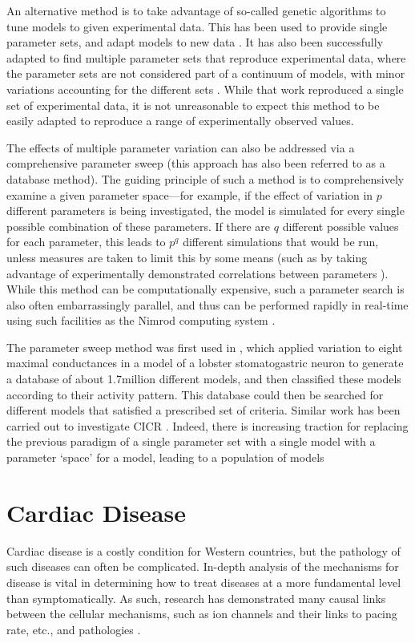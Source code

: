 \documentclass[../thesis-main.tex]{subfiles}
\begin{document}
 An alternative method is to take advantage of so-called genetic algorithms to tune models to given experimental data. This has been used to provide single parameter sets, and adapt models to new data \citep{Kherlopian2011}. It has also been successfully adapted to find multiple parameter sets that reproduce experimental data, where the parameter sets are not considered part of a continuum of models, with minor variations accounting for the different sets \citep{Achard2006, Syed2005}. While that work reproduced a single set of experimental data, it is not unreasonable to expect this method to be easily adapted to reproduce a range of experimentally observed values.
 
 The effects of multiple parameter variation can also be addressed via a comprehensive parameter sweep (this approach has also been referred to as a database method). The guiding principle of such a method is to comprehensively examine a given parameter space---for example, if the effect of variation in $p$ different parameters is being investigated, the model is simulated for every single possible combination of these parameters. If there are $q$ different possible values for each parameter, this leads to $p^q$ different simulations that would be run, unless measures are taken to limit this by some means (such as by taking advantage of experimentally demonstrated correlations between parameters \citep{Schulz2006}). While this method can be computationally expensive, such a parameter search is also often embarrassingly parallel, and thus can be performed rapidly in real-time using such facilities as the Nimrod computing system \citep{Abramson2000, Abramson1997, Abramson2010}.
 
 The parameter sweep method was first used in \citet{Prinz2003}, which applied variation to eight maximal conductances in a model of a lobster stomatogastric neuron to generate a database of about 1.7million different models, and then classified these models according to their activity pattern. This database could then be searched for different models that satisfied a prescribed set of criteria. Similar work has been carried out to investigate CICR \citep{Sobie2009b}. Indeed, there is increasing traction for replacing the previous paradigm of a single parameter set with a single model with a parameter `space' for a model, leading to a population of models \citep{Davies2012, Taylor2009, Prinz2003, Marder2011}
 
 \section{Cardiac Disease}
 \label{sec:disease}
 Cardiac disease is a costly condition for Western countries, but the pathology of such diseases can often be complicated. In-depth analysis of the mechanisms for disease is vital in determining how to treat diseases at a more fundamental level than symptomatically. As such, research has demonstrated many causal links between the cellular mechanisms, such as ion channels and their links to pacing rate, etc., and pathologies \citep{Inoue2006a, Kurz1993, Rodriguez2006, Dumaine1996, Nattel2010, Jurkat-Rott2005, Biagetti2006}.
 
\end{document}
